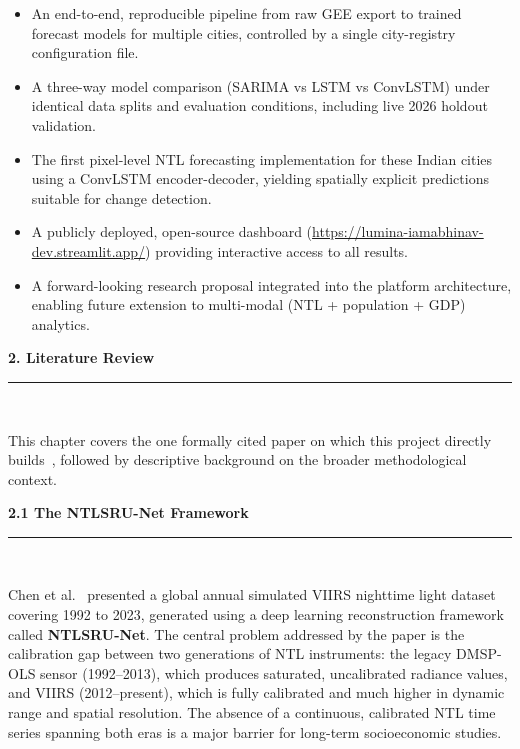 \documentclass[12pt,a4paper]{report}
\begin{document}
\begin{itemize}[leftmargin=1.5cm]
    \item An end-to-end, reproducible pipeline from raw GEE export to trained forecast models for multiple cities, controlled by a single city-registry configuration file.
    \item A three-way model comparison (SARIMA vs LSTM vs ConvLSTM) under identical data splits and evaluation conditions, including live 2026 holdout validation.
    \item The first pixel-level NTL forecasting implementation for these Indian cities using a ConvLSTM encoder-decoder, yielding spatially explicit predictions suitable for change detection.
    \item A publicly deployed, open-source dashboard (\url{https://lumina-iamabhinav-dev.streamlit.app/}) providing interactive access to all results.
    \item A forward-looking research proposal integrated into the platform architecture, enabling future extension to multi-modal (NTL + population + GDP) analytics.
\end{itemize}

\newpage
\thispagestyle{plain}
\begin{center}
    \hypertarget{sec:ch2}{}%
    {\Large \textbf{2. Literature Review}}\\[0.3cm]
    \noindent\rule{\linewidth}{0.6pt}\\[0.8cm]
\end{center}
\setlength{\parindent}{1cm}
\setlength{\parskip}{6pt}
\justifying

This chapter covers the one formally cited paper on which this project directly builds~\cite{chen2024}, followed by descriptive background on the broader methodological context.

\vspace{0.5cm}
\begin{center}
    \hypertarget{sec:s21}{}%
    {\large \textbf{2.1 The NTLSRU-Net Framework}}\\[0.3cm]
    \noindent\rule{\linewidth}{0.4pt}\\[0.5cm]
\end{center}

Chen et al.\ \cite{chen2024} presented a global annual simulated VIIRS nighttime light dataset covering 1992 to 2023, generated using a deep learning reconstruction framework called \textbf{NTLSRU-Net}. The central problem addressed by the paper is the calibration gap between two generations of NTL instruments: the legacy DMSP-OLS sensor (1992--2013), which produces saturated, uncalibrated radiance values, and VIIRS (2012--present), which is fully calibrated and much higher in dynamic range and spatial resolution. The absence of a continuous, calibrated NTL time series spanning both eras is a major barrier for long-term socioeconomic studies.
\end{document}
